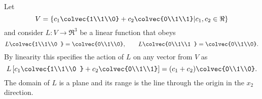 \begin{example}\label{Vdef} Let $$V=\left\{  c_1\colvec{1\\1\\0} +c_2\colvec{0\\1\\1} \middle| c_1,c_2\in \Re \right\} $$ and consider $L:V\to \Re^3$ be a linear function that obeys 
$$
L\colvec{1\\1\\0 } = \colvec{0\\1\\0},\qquad
L\colvec{0\\1\\1 } = \colvec{0\\1\\0}.
$$
By linearity this specifies the action of $L$ on any vector from $V$ as
$$
L\left[ c_1\colvec{1\\1\\0 } + c_2 \colvec{0\\1\\1} \right]= (c_1+c_2)\colvec{0\\1\\0}.
$$
The domain of $L$ is a plane and its range is the line through the origin in the $x_2$ direction. 



\end{example}
